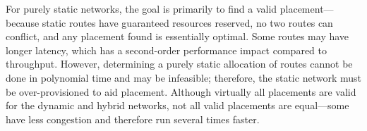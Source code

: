 For purely static networks, the goal is primarily to find a valid placement---because static routes have guaranteed resources reserved, no two routes can conflict, and any placement found is essentially optimal. 
Some routes may have longer latency, which has a second-order performance impact compared to throughput.
However, determining a purely static allocation of routes cannot be done in polynomial time and may be infeasible; therefore, the static network must be over-provisioned to aid placement.
Although virtually all placements are valid for the dynamic and hybrid networks,
not all valid placements are equal---some have less congestion and therefore run several times faster.

